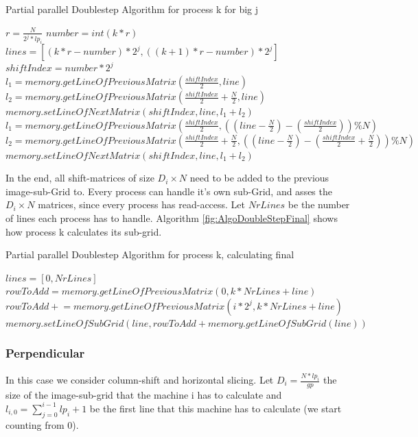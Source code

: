\documentclass[12pt]{article}
\begin{document}
\begin{algorithm}
\caption{Partial parallel Doublestep Algorithm for process k for big j}\label{euclid}
\label{fig:AlgoDoubleStepParaBig}
\begin{algorithmic}[1]
\State $r = \frac{N}{2^j*lp_i}$
\State $number = int(k*r)$
\State $lines = [(k*r-number)*2^j,((k+1)*r-number)*2^j]$
\State $shiftIndex =number*2^j$
          \State $l_1 = memory.getLineOfPreviousMatrix( \frac{shiftIndex}{2}, line )$
          \State $l_2 = memory.getLineOfPreviousMatrix( \frac{shiftIndex}{2}+\frac{N}{2},line )$
          \State $memory.setLineOfNextMatrix(shiftIndex, line, l_1+l_2)$
      \Else
          \State $l_1 = memory.getLineOfPreviousMatrix( \frac{shiftIndex}{2}, ((line-\frac{N}{2})-(\frac{shiftIndex}{2}))\%N )$
          \State $l_2 = memory.getLineOfPreviousMatrix( \frac{shiftIndex}{2}+\frac{N}{2},((line-\frac{N}{2})-(\frac{shiftIndex}{2}+\frac{N}{2}))\%N)$
          \State $memory.setLineOfNextMatrix(shiftIndex, line, l_1+l_2)$      
      \EndIf
\EndFor
\end{algorithmic}
\end{algorithm}

In the end, all shift-matrices of size $D_i \times N$ need to be added to the previous image-sub-Grid to. Every process can handle it's own sub-Grid, and asses the $D_i \times N$ matrices, since every process has read-access. Let $NrLines$ be the number of lines each process has to handle. Algorithm \ref{fig:AlgoDoubleStepFinal} shows how process k calculates its sub-grid.

\begin{algorithm}
\caption{Partial parallel Doublestep Algorithm for process k, calculating final}\label{euclid}
\label{fig:AlgoDoubleStepFinal}
\begin{algorithmic}[1]
\State $lines = [0 ,NrLines]$
      \State $rowToAdd = memory.getLineOfPreviousMatrix(0, k*NrLines+line)$
             \State $rowToAdd \mathrel{+}= memory.getLineOfPreviousMatrix(i*2^j, k*NrLines+line)$
      \EndFor
      \State $memory.setLineOfSubGrid(line, rowToAdd + memory.getLineOfSubGrid(line) )$
\EndFor
\end{algorithmic}
\end{algorithm}

\subsubsection{ Perpendicular }
In this case we consider column-shift and horizontal slicing.  Let $D_i=\frac{N*lp_i}{gp}$ the size of the image-sub-grid that the machine i has to calculate and $l_{i,0}=\sum_{j=0}^{i-1}lp_i+1$ be the first line that this machine has to calculate (we start counting from 0).\\
\end{document}
